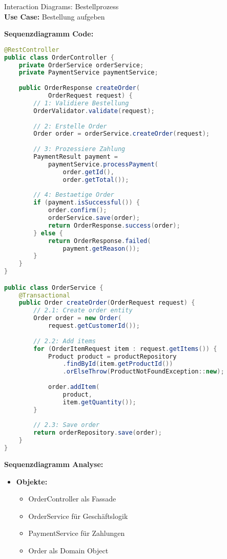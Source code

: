 \begin{example2}{Interaction Diagrams: Bestellprozess}\\
\textbf{Use Case:} Bestellung aufgeben

\textbf{Sequenzdiagramm Code:}
\begin{lstlisting}[language=Java, style=basesmol]
@RestController
public class OrderController {
    private OrderService orderService;
    private PaymentService paymentService;
    
    public OrderResponse createOrder(
            OrderRequest request) {
        // 1: Validiere Bestellung
        OrderValidator.validate(request);
        
        // 2: Erstelle Order
        Order order = orderService.createOrder(request);
        
        // 3: Prozessiere Zahlung
        PaymentResult payment = 
            paymentService.processPayment(
                order.getId(), 
                order.getTotal());
        
        // 4: Bestaetige Order
        if (payment.isSuccessful()) {
            order.confirm();
            orderService.save(order);
            return OrderResponse.success(order);
        } else {
            return OrderResponse.failed(
                payment.getReason());
        }
    }
}

public class OrderService {
    @Transactional
    public Order createOrder(OrderRequest request) {
        // 2.1: Create order entity
        Order order = new Order(
            request.getCustomerId());
            
        // 2.2: Add items
        for (OrderItemRequest item : request.getItems()) {
            Product product = productRepository
                .findById(item.getProductId())
                .orElseThrow(ProductNotFoundException::new);
                
            order.addItem(
                product, 
                item.getQuantity());
        }
        
        // 2.3: Save order
        return orderRepository.save(order);
    }
}
\end{lstlisting}

\textbf{Sequenzdiagramm Analyse:}
\begin{itemize}
    \item \textbf{Objekte:}
    \begin{itemize}
        \item OrderController als Fassade
        \item OrderService für Geschäftslogik
        \item PaymentService für Zahlungen
        \item Order als Domain Object
    \end{itemize}
    

\end{itemize}
\end{example2}
